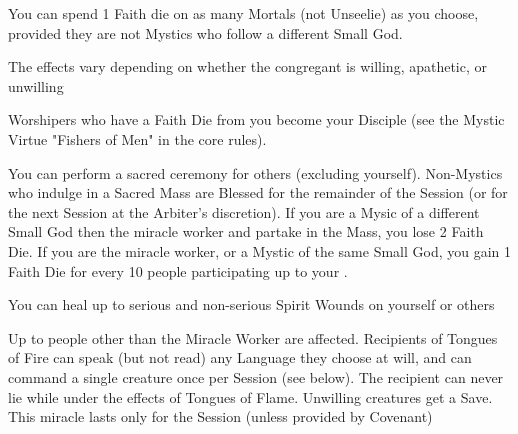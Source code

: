{You can spend 1 Faith die on as many Mortals (not Unseelie) as you choose, provided they are not Mystics who follow a different Small God.

The effects vary depending on whether the congregant is willing, apathetic, or unwilling


Worshipers who have a Faith Die from you become your Disciple (see the Mystic Virtue "Fishers of Men" in the core rules).


You can perform a sacred ceremony for \SUMDICE others (excluding yourself).  Non-Mystics who indulge in a Sacred Mass are Blessed for the remainder of the Session (or for the next Session at the Arbiter's discretion).  If you are a Mysic of a different Small God then the miracle worker and partake in the Mass, you lose 2 Faith Die.  If you are the miracle worker, or a Mystic of the same Small God, you gain 1 Faith Die for every 10 people participating up to your \MAX.



You can heal up to \DICE serious and non-serious Spirit Wounds on yourself or others


Up to \SUMDICE people other than the Miracle Worker are affected.  Recipients of Tongues of Fire can speak (but not read) any Language they choose at will, and can command a single creature once per Session (see below).  The recipient can never lie while under the effects of Tongues of Flame.  Unwilling creatures get a Save.  This miracle lasts only for the Session (unless provided by Covenant)


\MYSTERY [
  Name= Command,
  Link=miracle-command,
  Paradigm=Mind,
  Save=Y,
  Duration=0 ,
  Counter= n/a  ,
  Keywords=None ,
  Target=Nearby creature
]

}
